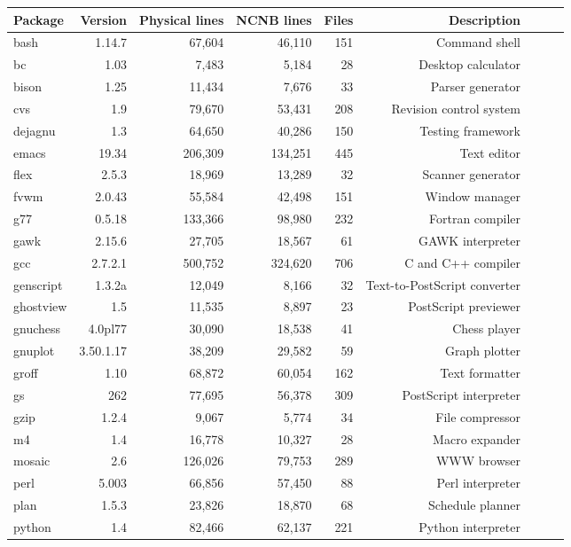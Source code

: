\begin{tabular}{|l|r|r|r|r|r|r|r|l|}\hline
Package & Version & Physical lines & NCNB lines & Files & Description\\\hline\hline
bash & 1.14.7 & 67,604 & 46,110 & 151 & Command shell \\\hline
bc & 1.03 & 7,483 & 5,184 & 28 & Desktop calculator \\\hline
bison & 1.25 & 11,434 & 7,676 & 33 & Parser generator \\\hline
cvs & 1.9 & 79,670 & 53,431 & 208 & Revision control system \\\hline
dejagnu & 1.3 & 64,650 & 40,286 & 150 & Testing framework \\\hline
emacs & 19.34 & 206,309 & 134,251 & 445 & Text editor\\\hline
flex & 2.5.3 & 18,969 & 13,289 & 32 & Scanner generator \\\hline
fvwm & 2.0.43 & 55,584 & 42,498 & 151 & Window manager \\\hline
g77 & 0.5.18 & 133,366 & 98,980 & 232 & Fortran compiler \\\hline
gawk & 2.15.6 & 27,705 & 18,567 & 61 & GAWK interpreter \\\hline
gcc & 2.7.2.1 & 500,752 & 324,620 & 706 & C and C++ compiler\\\hline
genscript & 1.3.2a & 12,049 & 8,166 & 32 & Text-to-PostScript converter \\\hline
ghostview & 1.5 & 11,535 & 8,897 & 23 & PostScript previewer \\\hline
gnuchess & 4.0pl77 & 30,090 & 18,538 & 41 & Chess player \\\hline
gnuplot & 3.50.1.17 & 38,209 & 29,582 & 59 & Graph plotter \\\hline
groff & 1.10 & 68,872 & 60,054 & 162 & Text formatter \\\hline
gs & 262 & 77,695 & 56,378 & 309 & PostScript interpreter \\\hline
gzip & 1.2.4 & 9,067 & 5,774 & 34 & File compressor \\\hline
m4 & 1.4 & 16,778 & 10,327 & 28 & Macro expander \\\hline
mosaic & 2.6 & 126,026 & 79,753 & 289 & WWW browser\\\hline
perl & 5.003 & 66,856 & 57,450 & 88 & Perl interpreter \\\hline
plan & 1.5.3 & 23,826 & 18,870 & 68 & Schedule planner \\\hline
python & 1.4 & 82,466 & 62,137 & 221 & Python interpreter \\\hline

\end{tabular}

